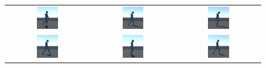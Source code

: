 \begin{figure}[H]
  \centering
  \begin{tabular}{ccc}
    \includegraphics[width=0.27\textwidth]{img/charakter_mixamo_laufen_energiespar1} & \includegraphics[width=0.27\textwidth]{img/charakter_mixamo_laufen_energiespar2}  & \includegraphics[width=0.27\textwidth]{img/charakter_mixamo_laufen_energiespar3} \\
    \includegraphics[width=0.27\textwidth]{img/charakter_mixamo_laufen_energiespar4}  & \includegraphics[width=0.27\textwidth]{img/charakter_mixamo_laufen_energiespar5}  & \includegraphics[width=0.27\textwidth]{img/charakter_mixamo_laufen_energiespar6} \\

\end{tabular}
\end{figure}
